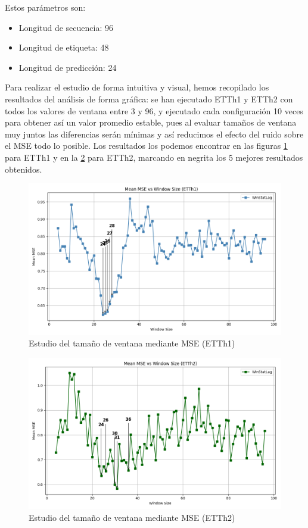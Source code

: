 Estos parámetros son:

\begin{itemize}
	\item Longitud de secuencia: 96
	\item Longitud de etiqueta: 48
	\item Longitud de predicción: 24
\end{itemize}

Para realizar el estudio de forma intuitiva y visual, hemos recopilado los resultados del análisis de forma gráfica: se han ejecutado ETTh1 y ETTh2 con todos los valores de ventana entre 3 y 96, y ejecutado cada configuración 10 veces para obtener así un valor promedio estable, pues al evaluar tamaños de ventana muy juntos las diferencias serán mínimas y así reducimos el efecto del ruido sobre el MSE todo lo posible. Los resultados los podemos encontrar en las figuras \ref{mean_mse_vs_window_ETTh1} para ETTh1 y en la \ref{mean_mse_vs_window_ETTh2} para ETTh2, marcando en negrita los 5 mejores resultados obtenidos.\\


\begin{figure}[H]
	\centering
	\includegraphics[scale=0.475]{img/mean_mse_vs_window_ETTh1}
	\caption{Estudio del tamaño de ventana mediante MSE (ETTh1)}
	\label{mean_mse_vs_window_ETTh1}
\end{figure}


\begin{figure}[H]
	\centering
	\includegraphics[scale=0.475]{img/mean_mse_vs_window_ETTh2}
	\caption{Estudio del tamaño de ventana mediante MSE (ETTh2)}
	\label{mean_mse_vs_window_ETTh2}
\end{figure}

